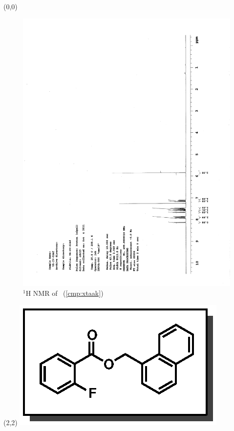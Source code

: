 \begin{textblock}{20}(0,0)
\begin{figure}[htb]
\caption{$^1$H NMR of \CMPxtaak\ (\ref{cmp:xtaak})}
\includegraphics[scale=0.75, trim = 0mm 0mm 0mm 5mm,
clip]{chp_asymmetric/images/nmr/xtaakH}
\vspace{-100pt}
\end{figure}
\end{textblock}
\begin{textblock}{1}(2,2)
\includegraphics[scale=0.8, angle=90]{chp_asymmetric/images/xtaak}
\end{textblock}
